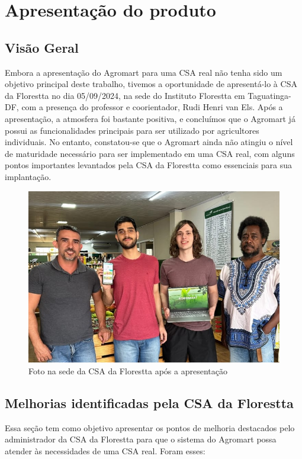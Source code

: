 \chapter[Apresentação do produto]{Apresentação do produto}
\section{Visão Geral}
Embora a apresentação do Agromart para uma CSA real não tenha sido um objetivo principal deste trabalho, tivemos a oportunidade de apresentá-lo à CSA da Florestta no dia 05/09/2024, na sede do Instituto Florestta em Taguatinga-DF, com a presença do professor e coorientador, Rudi Henri van Els. Após a apresentação, a atmosfera foi bastante positiva, e concluímos que o Agromart já possui as funcionalidades principais para ser utilizado por agricultores individuais. No entanto, constatou-se que o Agromart ainda não atingiu o nível de maturidade necessário para ser implementado em uma CSA real, com alguns pontos importantes levantados pela CSA da Florestta como essenciais para sua implantação.

\begin{figure}[h]
	\centering
	\includegraphics[keepaspectratio=true,scale=0.4]{figuras/apresentacao.png}
	\caption{Foto na sede da CSA da Florestta após a apresentação}
	\label{erro-ts-2}
\end{figure}

\section{Melhorias identificadas pela CSA da Florestta}
Essa seção tem como objetivo apresentar os pontos de melhoria destacados pelo administrador da CSA da Florestta para que o sistema do Agromart possa atender às necessidades de uma CSA real. Foram esses:


